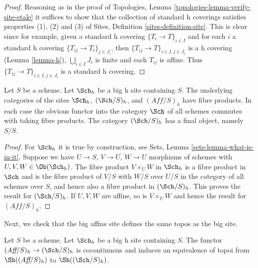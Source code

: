 \begin{proof}
Reasoning as in the proof of
Topologies, Lemma \ref{topologies-lemma-verify-site-etale}
it suffices to show that the collection of standard h coverings
satisfies properties (1), (2) and (3) of
Sites, Definition \ref{sites-definition-site}.
This is clear since for example, given a standard h covering
$\{T_i \to T\}_{i\in I}$ and for each
$i$ a standard h covering $\{T_{ij} \to T_i\}_{j \in J_i}$, then
$\{T_{ij} \to T\}_{i \in I, j\in J_i}$ is a h covering
(Lemma \ref{lemma-h}), $\bigcup_{i\in I} J_i$ is finite and
each $T_{ij}$ is affine. Thus $\{T_{ij} \to T\}_{i \in I, j\in J_i}$
is a standard h covering.
\end{proof}

\begin{lemma}
\label{lemma-fibre-products-h}
Let $S$ be a scheme. Let $\Sch_h$ be a big h
site containing $S$. The underlying categories of the sites
$\Sch_h$, $(\Sch/S)_h$, and $(\textit{Aff}/S)_h$ have fibre products.
In each case the obvious functor into the category $\Sch$ of
all schemes commutes with taking fibre products. The category
$(\Sch/S)_h$ has a final object, namely $S/S$.
\end{lemma}

\begin{proof}
For $\Sch_h$ it is true by construction, see
Sets, Lemma \ref{sets-lemma-what-is-in-it}.
Suppose we have $U \to S$, $V \to U$, $W \to U$ morphisms
of schemes with $U, V, W \in \Ob(\Sch_h)$.
The fibre product $V \times_U W$ in $\Sch_h$
is a fibre product in $\Sch$ and
is the fibre product of $V/S$ with $W/S$ over $U/S$ in
the category of all schemes over $S$, and hence also a
fibre product in $(\Sch/S)_h$.
This proves the result for $(\Sch/S)_h$.
If $U, V, W$ are affine, so is $V \times_U W$ and hence the
result for $(\textit{Aff}/S)_h$.
\end{proof}

\noindent
Next, we check that the big affine site defines the same
topos as the big site.

\begin{lemma}
\label{lemma-affine-big-site-h}
Let $S$ be a scheme. Let $\Sch_h$ be a big h
site containing $S$.
The functor $(\textit{Aff}/S)_h \to (\Sch/S)_h$
is cocontinuous and induces an equivalence of topoi from
$\Sh((\textit{Aff}/S)_h)$ to
$\Sh((\Sch/S)_h)$.
\end{lemma}

